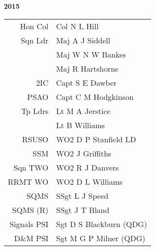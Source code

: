 \begin{center}
  \Huge
  \textbf{2015}
\end{center}

\begin{center}
  \small
  \begin{tabular}{rl}
    Hon Col & Col N L Hill \\
    Sqn Ldr & Maj A J Siddell \\
      & Maj W N W Bankes \\
      & Maj R Hartshorne \\
    2IC & Capt S E Dawber \\
    PSAO & Capt C M Hodgkinson \\
    Tp Ldrs & Lt M A  Jerstice \\
     & Lt B Williams \\
    RSUSO & WO2 D P Stanfield LD \\
    SSM & WO2 J Griffiths \\
    Sqn TWO & WO2 R J Danvers \\
    RRMT WO & WO2 D L Williams \\
    SQMS & SSgt L J Speed \\
    SQMS (R) & SSgt J T Bland \\
    Signals PSI & Sgt D S Blackburn (QDG) \\
    D\&M PSI & Sgt M G P Milner (QDG) \\
  \end{tabular}
\end{center}

